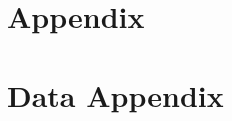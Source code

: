 \documentclass[letterpaper]{article} %
\begin{document}


\clearpage

% 

\clearpage

\section{Appendix}
\label{sec:otherappendix}


\clearpage


\section{Data Appendix}
\label{sec:dataappendix}


\clearpage

% 

\newpage







\end{document}
